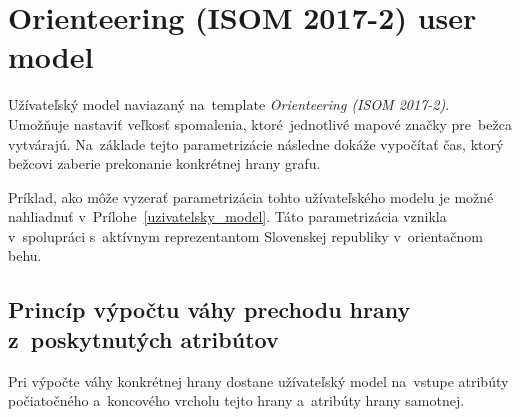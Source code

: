 \pagebreak

\section{Orienteering (ISOM 2017-2) user model}

Užívateľský model naviazaný na~template \textit{Orienteering (ISOM 2017-2)}. Umožňuje nastaviť veľkosť spomalenia, ktoré~jednotlivé mapové značky pre~bežca vytvárajú. Na~základe tejto parametrizácie následne dokáže vypočítať čas, ktorý bežcovi zaberie prekonanie konkrétnej hrany grafu.

Príklad, ako môže vyzerať parametrizácia tohto užívateľského modelu je možné nahliadnuť v~Prílohe~\ref{uzivatelsky_model}. Táto parametrizácia vznikla v~spolupráci s~aktívnym reprezentantom Slovenskej republiky v~orientačnom behu.

\subsection{Princíp výpočtu váhy prechodu hrany z~poskytnutých atribútov}

Pri výpočte váhy konkrétnej hrany dostane užívateľský model na~vstupe atribúty počiatočného a~koncového vrcholu tejto hrany a~atribúty hrany samotnej.

